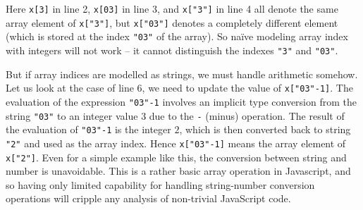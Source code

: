 \documentclass[sigplan,review,anonymous]{acmart}\settopmatter{printfolios=true,printccs=false,printacmref=false}
\begin{document}
Here \texttt{x[3]} in line 2, \texttt{x[03]} in line 3, and \texttt{x["3"]} in line 4 all denote the same array element of \texttt{x["3"]}, but \texttt{x["03"]} denotes a completely different element (which is stored at the index \texttt{"03"} of the array). So na\"ive modeling array index with integers will not work -- it cannot distinguish the indexes \texttt{"3"} and \texttt{"03"}. 

But if array indices are modelled as strings, we must handle arithmetic somehow. Let us look at the case of line 6, we need to update the value of \texttt{x["03"-1]}. The evaluation of the expression \texttt{"03"-1} involves an implicit type conversion from the string \texttt{"03"} to an integer value $3$ due to the \texttt{-} (minus) operation. The result of the evaluation of \texttt{"03"-1} is the integer $2$, which is then converted back to string \texttt{"2"} and used as the array index. Hence \texttt{x["03"-1]} means the array element of \texttt{x["2"]}. Even for a simple example like this, the conversion between string and number is unavoidable. This is a rather basic array operation in Javascript, and so having only limited capability for handling string-number conversion operations will cripple any analysis of non-trivial JavaScript code.



\end{document}
